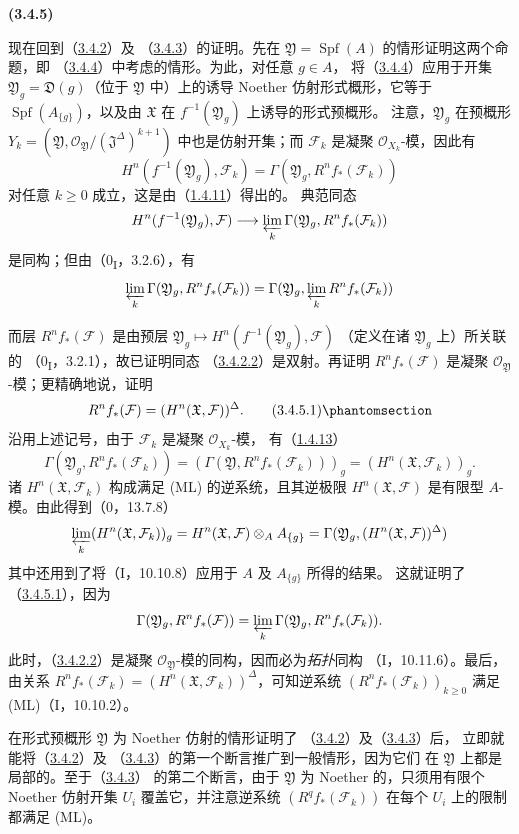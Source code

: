 \documentclass[UTF8,fontset=none,11pt,oneside,openany]{ctexbook}
\newenvironment{env}[1][]{%
  \par\medskip\noindent\textbf{(#1)}\ %
}{\par}
\newcommand{\oldpage}[2][]{%
  \hypertarget{ega-source-page-#1-#2}{}%
  \marginnote{\scriptsize\textbf{#1}~|~#2}\ignorespaces}
\let\EGAOriginalLabel\label
\renewcommand{\label}[1]{\phantomsection\EGAOriginalLabel{#1}}
\begin{document}
\begin{env}[3.4.5]
\label{III.3.4.5-fr}
现在回到（\hyperref[III.3.4.2-fr]{3.4.2}）及
（\hyperref[III.3.4.3-fr]{3.4.3}）的证明。先在
$\mathfrak Y=\operatorname{Spf}(A)$ 的情形证明这两个命题，即
（\hyperref[III.3.4.4-fr]{3.4.4}）中考虑的情形。为此，对任意 $g\in A$，
将（\hyperref[III.3.4.4-fr]{3.4.4}）应用于开集
$\mathfrak Y_g=\mathfrak D(g)$（位于 $\mathfrak Y$ 中）上的诱导 Noether
仿射形式概形，它等于 $\operatorname{Spf}(A_{\{g\}})$，以及由
$\mathfrak X$ 在 $f^{-1}(\mathfrak Y_g)$ 上诱导的形式预概形。
注意，$\mathfrak Y_g$ 在预概形
$Y_k=(\mathfrak Y,\mathcal O_{\mathfrak Y}/(\mathfrak J^\Delta)^{k+1})$
中也是仿射开集；而 $\mathcal F_k$ 是凝聚 $\mathcal O_{X_k}$-模，因此有
\[
H^n(f^{-1}(\mathfrak Y_g),\mathcal F_k)
=\Gamma(\mathfrak Y_g,R^nf_*(\mathcal F_k))
\]
对任意 $k\geq0$ 成立，这是由（\hyperref[III.1.4.11-fr]{1.4.11}）得出的。
典范同态
\[
H^n(f^{-1}(\mathfrak Y_g),\mathcal F)
\longrightarrow\varprojlim_k\Gamma(\mathfrak Y_g,R^nf_*(\mathcal F_k))
\]
是同构；但由（0\textsubscript{I}，3.2.6），有
\[
\varprojlim_k\Gamma(\mathfrak Y_g,R^nf_*(\mathcal F_k))
=\Gamma(\mathfrak Y_g,\varprojlim_kR^nf_*(\mathcal F_k))
\]

\oldpage[III]{122}
而层 $R^nf_*(\mathcal F)$ 是由预层
$\mathfrak Y_g\mapsto H^n(f^{-1}(\mathfrak Y_g),\mathcal F)$
（定义在诸 $\mathfrak Y_g$ 上）所关联的
（0\textsubscript{I}，3.2.1），故已证明同态
（\hyperref[III.3.4.2.2-fr]{3.4.2.2}）是双射。再证明
$R^nf_*(\mathcal F)$ 是凝聚 $\mathcal O_{\mathfrak Y}$-模；更精确地说，证明
\[
R^nf_*(\mathcal F)=(H^n(\mathfrak X,\mathcal F))^\Delta.
\tag{3.4.5.1}\label{III.3.4.5.1-fr}
\]
沿用上述记号，由于 $\mathcal F_k$ 是凝聚 $\mathcal O_{X_k}$-模，
有（\hyperref[III.1.4.13-fr]{1.4.13}）
\[
\Gamma(\mathfrak Y_g,R^nf_*(\mathcal F_k))
=(\Gamma(\mathfrak Y,R^nf_*(\mathcal F_k)))_g
=(H^n(\mathfrak X,\mathcal F_k))_g.
\]
诸 $H^n(\mathfrak X,\mathcal F_k)$ 构成满足 (ML) 的逆系统，且其逆极限
$H^n(\mathfrak X,\mathcal F)$ 是有限型 $A$-模。由此得到（0，13.7.8）
\[
\varprojlim_k(H^n(\mathfrak X,\mathcal F_k))_g
=H^n(\mathfrak X,\mathcal F)\otimes_AA_{\{g\}}
=\Gamma(\mathfrak Y_g,(H^n(\mathfrak X,\mathcal F))^\Delta)
\]
其中还用到了将（I，10.10.8）应用于 $A$ 及 $A_{\{g\}}$ 所得的结果。
这就证明了（\hyperref[III.3.4.5.1-fr]{3.4.5.1}），因为
\[
\Gamma(\mathfrak Y_g,R^nf_*(\mathcal F))
=\varprojlim_k\Gamma(\mathfrak Y_g,R^nf_*(\mathcal F_k)).
\]
此时，（\hyperref[III.3.4.2.2-fr]{3.4.2.2}）是凝聚
$\mathcal O_{\mathfrak Y}$-模的同构，因而必为\emph{拓扑}同构
（I，10.11.6）。最后，由关系
$R^nf_*(\mathcal F_k)=(H^n(\mathfrak X,\mathcal F_k))^\Delta$，可知逆系统
$(R^nf_*(\mathcal F_k))_{k\geq0}$ 满足 (ML)（I，10.10.2）。

在形式预概形 $\mathfrak Y$ 为 Noether 仿射的情形证明了
（\hyperref[III.3.4.2-fr]{3.4.2}）及（\hyperref[III.3.4.3-fr]{3.4.3}）后，
立即就能将（\hyperref[III.3.4.2-fr]{3.4.2}）及
（\hyperref[III.3.4.3-fr]{3.4.3}）的第一个断言推广到一般情形，因为它们
在 $\mathfrak Y$ 上都是局部的。至于（\hyperref[III.3.4.3-fr]{3.4.3}）
的第二个断言，由于 $\mathfrak Y$ 为 Noether 的，只须用有限个 Noether
仿射开集 $U_i$ 覆盖它，并注意逆系统 $(R^qf_*(\mathcal F_k))$
在每个 $U_i$ 上的限制都满足 (ML)。
\end{env}
\end{document}
